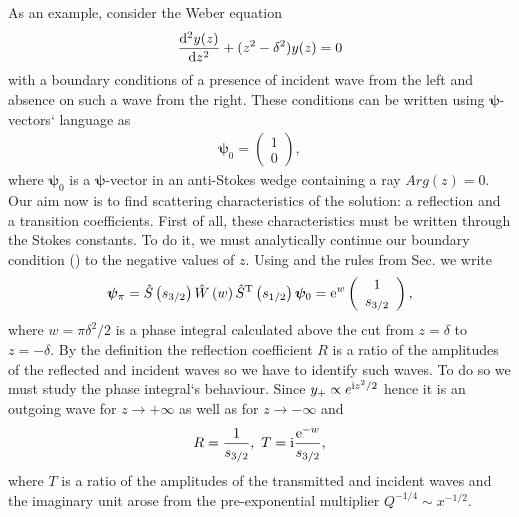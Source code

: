 \documentclass[12pt]{iopart}
\def\S{\hat{S}}
\def\W{\hat{W}}
\def\psii{\bm\psi}
\def\T{\mathrm{T}}
\begin{document}
As an example, consider the Weber equation
\begin{eqnarray}
\frac{\mathrm{d}^2 y(z)}{\mathrm{d} z^2}+(z^2-\delta^2)y(z)=0
\label{eq:weber}
\end{eqnarray}
with a boundary conditions of a presence of incident wave from the left and absence on such a wave from the right. These conditions can be written using $\psii$-vectors` language as
\begin{eqnarray}
\psii_0 = \left(\begin{array}{*{2}{c}} 1 \\ 0 \end{array}\right),
\label{eq:wbound}
\end{eqnarray}
where $\psii_0$ is a $\psii$-vector in an anti-Stokes wedge containing a ray $Arg(z)=0$. Our aim now is to find scattering characteristics of the solution: a reflection and a transition coefficients. First of all, these characteristics must be written through the Stokes constants. To do it, we must analytically continue our boundary condition () 
to the negative values of $z$. Using  and the rules from Sec. we write
\begin{eqnarray}
\psii_{\pi} = 
\S \left( s_{3/2} \right)
\W \left( w \right) 
\S^{\T} \left( s_{1/2} \right) \psii_0 = 
\rme^w \left(\begin{array}{*{2}{c}} 1 \\ s_{3/2} \end{array}\right),
\end{eqnarray}
where $w=\pi\delta^2/2$ is a phase integral calculated above the cut from $z=\delta$ to $z=-\delta$. By the definition the reflection coefficient $R$ is a ratio of the amplitudes of the reflected and incident waves so we have to identify such waves. To do so we must study the phase integral`s behaviour. Since $y_+ \propto e^{\mathrm{i} z^2/2}$ hence it is an outgoing wave for $z \rightarrow +\infty$ as well as for $z \rightarrow -\infty$ and
\begin{eqnarray}
R = \frac{1}{s_{3/2}},\ T=\mathrm{i}\frac{\mathrm{e}^{-w}}{s_{3/2}},
\end{eqnarray}
where $T$ is a ratio of the amplitudes of the transmitted and incident waves and the imaginary unit arose from the pre-exponential multiplier $Q^{-1/4} \sim x^{-1/2}$.
\end{document}
